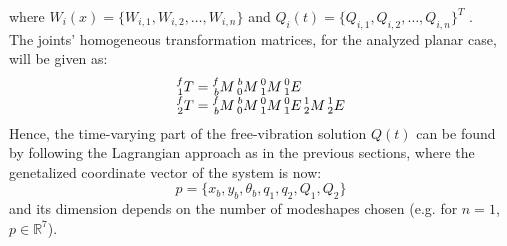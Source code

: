 \documentclass[a4paper,12pt,oneside]{report}
\begin{document}
where $W_i(x)=\{W_{i,1},W_{i,2},\dots,W_{i,n}\}$ and $Q_i(t)=\{Q_{i,1},Q_{i,2},\dots,Q_{i,n}\}^T$ \cite{sixteen}.\\
The joints' homogeneous transformation matrices, for the analyzed planar case, will be given as:
\begin{equation}
  \begin{array}{l}
  \prescript{f}{1}{T}=\prescript{f}{b}{M}\prescript{b}{0}{M}\prescript{0}{1}{M}\prescript{0}{1}{E}\\
  \prescript{f}{2}{T}=\prescript{f}{b}{M}\prescript{b}{0}{M}\prescript{0}{1}{M}\prescript{0}{1}{E}\prescript{1}{2}{M}\prescript{1}{2}{E}\\
  \end{array}
  \label{new_kinematics}
\end{equation}
Hence, the time-varying part of the free-vibration solution $Q(t)$ can be found by following the Lagrangian approach as in the previous sections, where the genetalized coordinate vector of the system is now:
\begin{equation}
  p=\{x_b,y_b,\theta_b,q_1,q_2,Q_1,Q_2\}
  \label{new_coordinates}
\end{equation}
and its dimension depends on the number of modeshapes chosen (e.g. for $n=1$, $p\in\mathbb{R}^7$).\\
\end{document}
